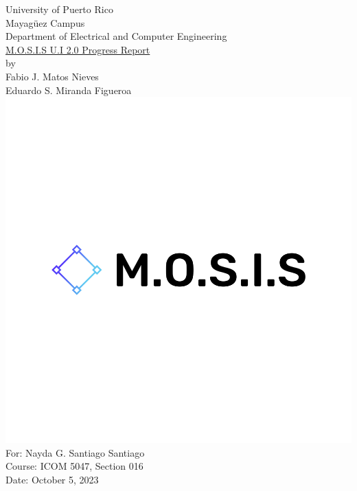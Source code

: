 \linespread{1.0}
\begin{titlepage}
	\begin{center}
		\large{University of Puerto Rico\\
			Mayagüez Campus\\
			\vspace{\baselineskip}
			Department of Electrical and Computer Engineering}\\
		\vspace{5\baselineskip}
		\Huge{\underline{M.O.S.I.S U.I 2.0 Progress Report}\\}
		\vspace{\baselineskip}
		\large by\\
		Fabio J. Matos Nieves\\
		Eduardo S. Miranda Figueroa\\
		\normalsize
		\includegraphics[scale=0.15]{../../M.O.S.I.S Logo/default.png}\\
		\vspace{4\baselineskip}
		\large
		For: Nayda G. Santiago Santiago\\
		Course: ICOM 5047, Section 016\\
		Date: October 5, 2023\\
		\normalsize

	\end{center}
\end{titlepage}